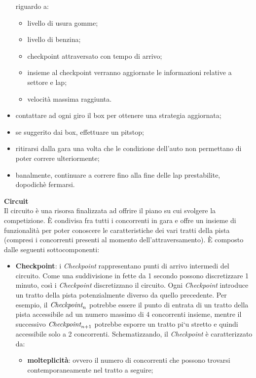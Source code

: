 \begin{description}
\begin{itemize}
			riguardo a:
			\begin{itemize}
				\item livello di usura gomme;
				\item livello di benzina;
				\item checkpoint attraversato con tempo di arrivo;
				\item insieme al checkpoint verranno aggiornate le informazioni relative a settore e lap;
				\item velocit\`{a} massima raggiunta.
			\end{itemize}
		\item contattare ad ogni giro il box per ottenere una strategia aggiornata;
		\item se suggerito dai box, effettuare un pitstop;
		\item ritirarsi dalla gara una volta che le condizione dell'auto non permettano di poter correre ulteriormente;
		\item banalmente, continuare a correre fino alla fine delle lap prestabilite, dopodich\`{e} fermarsi.
	\end{itemize}
\item{\textbf{Circuit}}\\
Il circuito \`{e} una risorsa finalizzata ad offrire il piano su cui svolgere la competizione. \`{E} condivisa fra tutti i concorrenti in gara e
offre un insieme di funzionalit\`{a} per poter conoscere le caratteristiche dei vari tratti della pista (compresi i concorrenti presenti
al momento dell'attraversamento). \`{E} composto dalle seguenti sottocomponenti:
\begin{itemize}
\item \textbf{Checkpoint}:
i \emph{Checkpoint} rappresentano punti di arrivo intermedi del circuito. Come una suddivisione in fette da 1 secondo possono discretizzare 1 minuto,
cos\`{i} i \emph{Checkpoint} discretizzano il circuito. Ogni \emph{Checkpoint} introduce un tratto della pista potenzialmente diverso da quello precedente.
Per esempio, il $\emph{Checkpoint}_n$ potrebbe essere il punto di entrata di un tratto della pista accessibile ad un numero massimo di 4 concorrenti insieme,
mentre il successivo $\emph{Checkpoint}_{n+1}$ potrebbe esporre un tratto pi`{u} stretto e quindi accessibile solo a 2 concorrenti. Schematizzando, 
il \emph{Checkpoint} \`{e} caratterizzato da:
\begin{itemize}
\item \textbf{molteplicit\`{a}}: ovvero il numero di concorrenti che possono trovarsi contemporaneamente nel tratto a seguire;

\end{itemize}
\end{itemize}
\end{description}
